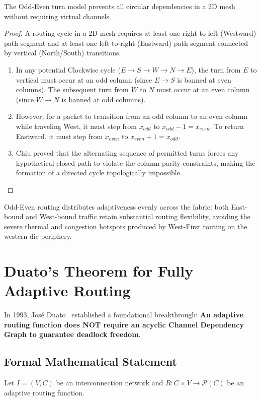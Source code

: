 \begin{theorem}
The Odd-Even turn model prevents all circular dependencies in a 2D mesh without requiring virtual channels.
\end{theorem}

\begin{proof}
A routing cycle in a 2D mesh requires at least one right-to-left (Westward) path segment and at least one left-to-right (Eastward) path segment connected by vertical (North/South) transitions.
\begin{enumerate}
    \item In any potential Clockwise cycle ($E \to S \to W \to N \to E$), the turn from $E$ to vertical must occur at an odd column (since $E \to S$ is banned at even columns). The subsequent turn from $W$ to $N$ must occur at an even column (since $W \to N$ is banned at odd columns).
    \item However, for a packet to transition from an odd column to an even column while traveling West, it must step from $x_{odd}$ to $x_{odd} - 1 = x_{even}$. To return Eastward, it must step from $x_{even}$ to $x_{even} + 1 = x_{odd}$.
    \item Chiu proved that the alternating sequence of permitted turns forces any hypothetical closed path to violate the column parity constraints, making the formation of a directed cycle topologically impossible.
\end{enumerate}
\end{proof}

Odd-Even routing distributes adaptiveness evenly across the fabric: both East-bound and West-bound traffic retain substantial routing flexibility, avoiding the severe thermal and congestion hotspots produced by West-First routing on the western die periphery.

\section{Duato's Theorem for Fully Adaptive Routing}
\label{sec:ch5_duato}

In 1993, Jos{\'e} Duato~\cite{Duato1993} established a foundational breakthrough: \textbf{An adaptive routing function does NOT require an acyclic Channel Dependency Graph to guarantee deadlock freedom}.

\subsection{Formal Mathematical Statement}
Let $I = (V, C)$ be an interconnection network and $R: C \times V \to \mathcal{P}(C)$ be an adaptive routing function.

